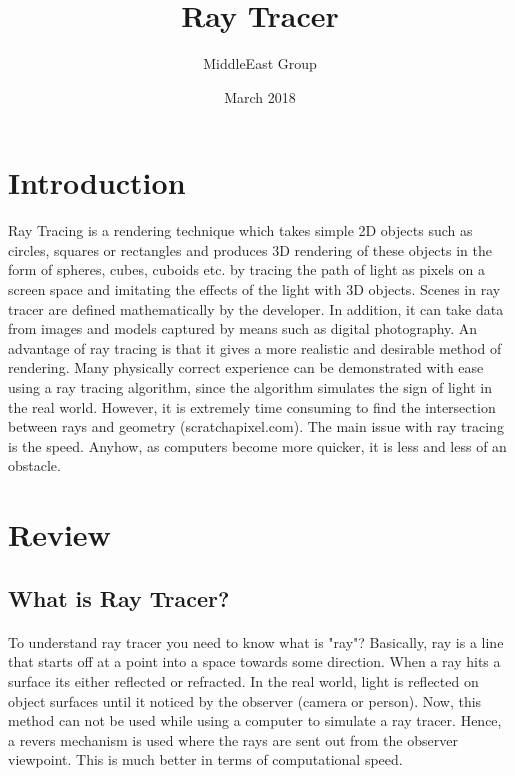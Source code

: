 \documentclass{article}
\title{Ray Tracer}
\author{MiddleEast Group }
\date{March 2018}
\begin{document}
\maketitle 

\section{Introduction}

Ray Tracing is a rendering technique which takes simple 2D objects such as circles, squares or rectangles and
produces 3D rendering of these objects in the form of spheres, cubes, cuboids etc.  by tracing the path of light as pixels on a screen space and imitating the effects of the light  with 3D objects. Scenes in ray tracer are defined mathematically by the developer. In addition, it can take data from images and models captured by means such as digital photography. \newline An advantage of ray tracing is that it gives a more realistic and desirable method of rendering. Many physically correct experience can be demonstrated with ease using a ray tracing algorithm, since the algorithm simulates the sign of light in the real world.
However, it is extremely time consuming to find the intersection between rays and geometry (scratchapixel.com). The main issue with ray tracing is the speed. Anyhow, as computers become more quicker, it is less and less of an obstacle. 

\section{Review}
\subsection{What is Ray Tracer?}

\paragraph{}
To understand ray tracer you need to know what is "ray"? Basically, ray is a line that starts off at a point into a space towards some direction. When a ray hits a surface its either reflected or refracted.
In the real world, light is reflected on object surfaces until it noticed by the observer (camera or person). \newline Now, this method can not be used while using a computer to simulate a ray tracer. Hence, a revers mechanism is used where the rays are sent out from the observer viewpoint. This is much better in terms of computational speed. 
\end{document}
